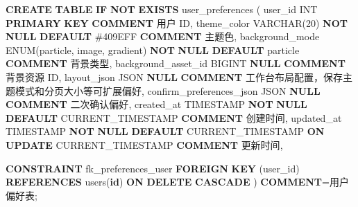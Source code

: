 \documentclass[
  a4paper,
  UTF8]{ctexart}
\newenvironment{Shaded}{}{}
\newcommand{\ControlFlowTok}[1]{\textcolor[rgb]{0.00,0.44,0.13}{\textbf{#1}}}
\newcommand{\DataTypeTok}[1]{\textcolor[rgb]{0.56,0.13,0.00}{#1}}
\newcommand{\DecValTok}[1]{\textcolor[rgb]{0.25,0.63,0.44}{#1}}
\newcommand{\FunctionTok}[1]{\textcolor[rgb]{0.02,0.16,0.49}{#1}}
\newcommand{\KeywordTok}[1]{\textcolor[rgb]{0.00,0.44,0.13}{\textbf{#1}}}
\newcommand{\NormalTok}[1]{#1}
\newcommand{\OperatorTok}[1]{\textcolor[rgb]{0.40,0.40,0.40}{#1}}
\newcommand{\StringTok}[1]{\textcolor[rgb]{0.25,0.44,0.63}{#1}}
\begin{document}
\begin{Shaded}
\begin{Highlighting}[]
\KeywordTok{CREATE} \KeywordTok{TABLE} \ControlFlowTok{IF} \KeywordTok{NOT} \KeywordTok{EXISTS}\NormalTok{ user\_preferences (}
\NormalTok{  user\_id }\DataTypeTok{INT} \KeywordTok{PRIMARY} \KeywordTok{KEY} \KeywordTok{COMMENT} \StringTok{\textquotesingle{}用户 ID\textquotesingle{}}\NormalTok{,}
\NormalTok{  theme\_color }\DataTypeTok{VARCHAR}\NormalTok{(}\DecValTok{20}\NormalTok{) }\KeywordTok{NOT} \KeywordTok{NULL} \KeywordTok{DEFAULT} \StringTok{\textquotesingle{}\#409EFF\textquotesingle{}} \KeywordTok{COMMENT} \StringTok{\textquotesingle{}主题色\textquotesingle{}}\NormalTok{,}
\NormalTok{  background\_mode ENUM(}\StringTok{\textquotesingle{}particle\textquotesingle{}}\NormalTok{, }\StringTok{\textquotesingle{}image\textquotesingle{}}\NormalTok{, }\StringTok{\textquotesingle{}gradient\textquotesingle{}}\NormalTok{) }\KeywordTok{NOT} \KeywordTok{NULL} \KeywordTok{DEFAULT} \StringTok{\textquotesingle{}particle\textquotesingle{}} \KeywordTok{COMMENT} \StringTok{\textquotesingle{}背景类型\textquotesingle{}}\NormalTok{,}
\NormalTok{  background\_asset\_id BIGINT }\KeywordTok{NULL} \KeywordTok{COMMENT} \StringTok{\textquotesingle{}背景资源 ID\textquotesingle{}}\NormalTok{,}
\NormalTok{  layout\_json JSON }\KeywordTok{NULL} \KeywordTok{COMMENT} \StringTok{\textquotesingle{}工作台布局配置，保存主题模式和分页大小等可扩展偏好\textquotesingle{}}\NormalTok{,}
\NormalTok{  confirm\_preferences\_json JSON }\KeywordTok{NULL} \KeywordTok{COMMENT} \StringTok{\textquotesingle{}二次确认偏好\textquotesingle{}}\NormalTok{,}
\NormalTok{  created\_at }\DataTypeTok{TIMESTAMP} \KeywordTok{NOT} \KeywordTok{NULL} \KeywordTok{DEFAULT} \FunctionTok{CURRENT\_TIMESTAMP} \KeywordTok{COMMENT} \StringTok{\textquotesingle{}创建时间\textquotesingle{}}\NormalTok{,}
\NormalTok{  updated\_at }\DataTypeTok{TIMESTAMP} \KeywordTok{NOT} \KeywordTok{NULL} \KeywordTok{DEFAULT} \FunctionTok{CURRENT\_TIMESTAMP} \KeywordTok{ON} \KeywordTok{UPDATE} \FunctionTok{CURRENT\_TIMESTAMP} \KeywordTok{COMMENT} \StringTok{\textquotesingle{}更新时间\textquotesingle{}}\NormalTok{,}

  \KeywordTok{CONSTRAINT}\NormalTok{ fk\_preferences\_user}
    \KeywordTok{FOREIGN} \KeywordTok{KEY}\NormalTok{ (user\_id) }\KeywordTok{REFERENCES}\NormalTok{ users(}\KeywordTok{id}\NormalTok{)}
    \KeywordTok{ON} \KeywordTok{DELETE} \KeywordTok{CASCADE}
\NormalTok{) }\KeywordTok{COMMENT}\OperatorTok{=}\StringTok{\textquotesingle{}用户偏好表\textquotesingle{}}\NormalTok{;}
\end{Highlighting}
\end{Shaded}
\end{document}
